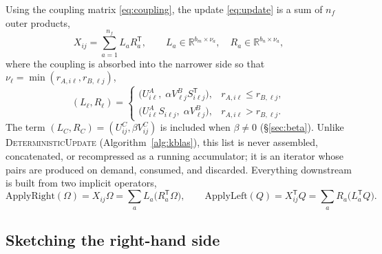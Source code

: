 \documentclass[11pt]{article}
\newcommand{\R}{\mathbb{R}}
\newcommand{\T}{\mathsf{T}}
\begin{document}
Using the coupling matrix \eqref{eq:coupling}, the update \eqref{eq:update} is
a sum of $n_f$ outer products,
\begin{equation}
\label{eq:list}
X_{ij}=\sum_{a=1}^{n_f}L_aR_a^{\T},
\qquad
L_a\in\R^{b_m\times\nu_a},\quad R_a\in\R^{b_n\times\nu_a},
\end{equation}
where the coupling is absorbed into the narrower side so that
$\nu_\ell=\min(r_{A,i\ell},r_{B,\ell j})$,
\begin{equation}
\label{eq:absorb}
(L_\ell,R_\ell)=
\begin{cases}
\bigl(U^A_{i\ell},\;\alpha V^B_{\ell j}S_{i\ell j}^{\T}\bigr),
& r_{A,i\ell}\le r_{B,\ell j},\\[4pt]
\bigl(U^A_{i\ell}S_{i\ell j},\;\alpha V^B_{\ell j}\bigr),
& r_{A,i\ell}>r_{B,\ell j}.
\end{cases}
\end{equation}
The term $(L_C,R_C)=(U^C_{ij},\beta V^C_{ij})$ is included when $\beta\ne0$
(\S\ref{sec:beta}). Unlike \textsc{DeterministicUpdate}
(Algorithm~\ref{alg:kblas}), this list is never assembled, concatenated, or
recompressed as a running accumulator; it is an iterator whose pairs are
produced on demand, consumed, and discarded. Everything downstream is built
from two implicit operators,
\begin{equation}
\label{eq:apply}
\mathrm{ApplyRight}(\Omega)=X_{ij}\Omega=\sum_aL_a\bigl(R_a^{\T}\Omega\bigr),
\qquad
\mathrm{ApplyLeft}(Q)=X_{ij}^{\T}Q=\sum_aR_a\bigl(L_a^{\T}Q\bigr).
\end{equation}

\subsection{Sketching the right-hand side}
\label{sec:ordering}
\end{document}
